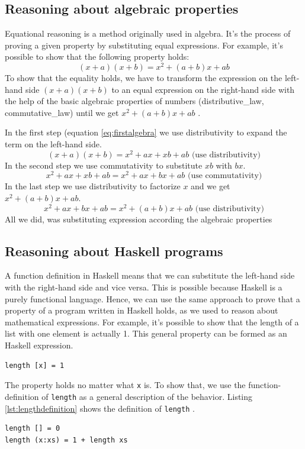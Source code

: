 \subsection{Reasoning about algebraic properties}

Equational reasoning is a method originally used in algebra. It's the process of proving a given property by substituting equal expressions.
For example, it's possible to show that the following property holds:
\begin{equation}
  \label{eq:sum}
  (x+a)(x+b) = x^2 + (a+b)x+ab
\end{equation}
To show that the equality holds, we have to transform the expression on the left-hand side  $(x+a)(x+b)$  to an equal expression on the right-hand side with the help of the basic algebraic properties of numbers (\gls{distributive_law}, \gls{commutative_law}) until we get $x^2 + (a+b)x+ab$  \cite{hutton}. 

In the first step (equation \ref{eq:firstalgebra} we use distributivity to expand the term on the left-hand side.
\begin{equation}
  \label{eq:firstalgebra}
  (x+a)(x+b) = x^2 + ax + xb + ab \text{     (use distributivity)}
\end{equation}
In the second step we use commutativity to substitute $xb$ with $bx$.
\begin{equation}
x^2 + ax + xb + ab = x^2 + ax + bx + ab \text{     (use commutativity)}
\end{equation}
In the last step we use distributivity to factorize $x$ and we get $x^2 + (a+b)x+ab$.
\begin{equation}
x^2 + ax + bx + ab = x^2 + (a + b)x + ab \text{     (use distributivity)}
\end{equation}
All we did, was substituting expression according the algebraic properties 

\subsection{Reasoning about Haskell programs}

A function definition in Haskell means that we can substitute the left-hand side with the right-hand side and vice versa. This is possible because Haskell is a purely functional language. Hence, we can use the same approach to prove that a property of a program written in Haskell holds, as we used to reason about mathematical expressions. 
For example, it's possible to show that the length of a list with one element is actually 1. This general property can be formed as an Haskell expression. 
\begin{verbatim}
length [x] = 1
\end{verbatim}
The property holds no matter what \verb|x| is. To show that, we use the \gls{function-definition} of \verb|length| as a general description of the behavior. Listing \ref{lst:lengthdefinition} shows the definition of \verb|length| \cite{hutton}.
\begin{lstlisting}[caption={Function definition of {\ttfamily length}},label={lst:lengthdefinition}]
length [] = 0
length (x:xs) = 1 + length xs  
\end{lstlisting}

